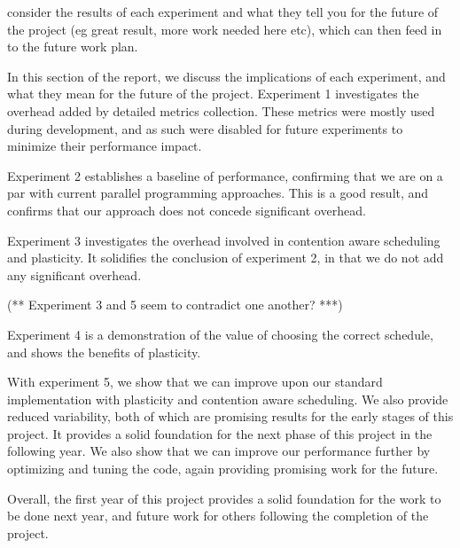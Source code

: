 consider the results of each experiment and what they tell you for the future of the project (eg great result, more work needed here etc), which can then feed in to the future work plan.

In this section of the report, we discuss the implications of each experiment, and what they mean for the future of the project. Experiment 1 investigates the overhead added by detailed metrics collection. These metrics were mostly used during development, and as such were disabled for future experiments to minimize their performance impact. 

Experiment 2 establishes a baseline of performance, confirming that we are on a par with current parallel programming approaches. This is a good result, and confirms that our approach does not concede significant overhead. 

Experiment 3 investigates the overhead involved in contention aware scheduling and plasticity. It solidifies the conclusion of experiment 2, in that we do not add any significant overhead.

(** Experiment 3 and 5 seem to contradict one another? ***)

Experiment 4 is a demonstration of the value of choosing the correct schedule, and shows the benefits of plasticity. 

With experiment 5, we show that we can improve upon our standard implementation with plasticity and contention aware scheduling. We also provide reduced variability, both of which are promising results for the early stages of this project. It provides a solid foundation for the next phase of this project in the following year. We also show that we can improve our performance further by optimizing and tuning the code, again providing promising work for the future.

Overall, the first year of this project provides a solid foundation for the work to be done next year, and future work for others following the completion of the project.